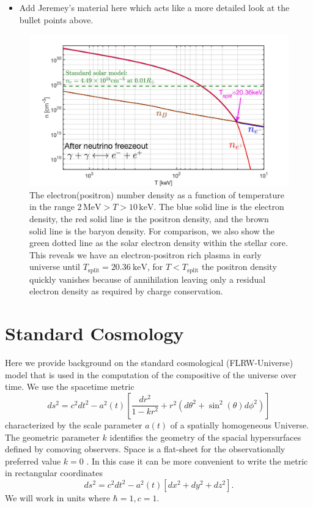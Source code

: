 \documentclass[Universe,article,submit,moreauthors,pdftex]{Definitions/mdpi}
\newcommand{\beqn}{\begin{equation}}
\newcommand{\eeqn}{\end{equation}}
\newcommand*{\xred}{\color{red}}
\begin{document}
\begin{itemize}
    \item {\xred Add Jeremey's material here which acts like a more detailed look at the bullet points above.}
\end{itemize}
\begin{figure}[h]
  \centering
  \includegraphics[width=\linewidth]{./plots/NewDensity_cm3.jpg}
  \caption{The electron(positron) number density as a function of temperature in the range $2\,\mathrm{MeV}>T>10\,\mathrm{keV}$. The blue solid line is the electron density, the red solid line is the positron density, and the brown solid line is the baryon density. For comparison, we also show the green dotted line as the solar electron density within the stellar core. This reveals we have an electron-positron rich plasma in early universe until $T_{\mathrm{split}} = 20.36\ \mathrm{keV}$, for $T<T_{\mathrm{split}}$ the positron density quickly vanishes because of annihilation leaving only a residual electron density as required by charge conservation.}
  \label{Density_fig} 
\end{figure}

\section{Standard Cosmology}\label{sec:Cosmo}
\noindent Here we provide background on the standard  cosmological (FLRW-Universe) model that is used in the computation of the compositive of the universe over time. We use the spacetime metric
\beqn\label{metric}
ds^2=c^2dt^2-a^2(t)\left[ \frac{dr^2}{1-kr^2}+r^2(d\theta^2+\sin^2(\theta)d\phi^2)\right]
\eeqn
characterized  by the scale parameter $a(t)$  of a spatially homogeneous  Universe. The geometric parameter $k$ identifies the geometry of the spacial hypersurfaces defined by comoving observers. Space is a flat-sheet for the observationally preferred value $k=0$ \cite{Planck}. In this case it can be more convenient to write the metric in rectangular coordinates
\beqn\label{metric2}
ds^2=c^2dt^2-a^2(t)\left[ dx^2+dy^2+dz^2\right].
\eeqn
We will work in units where $\hbar=1,c=1$.
\end{document}
